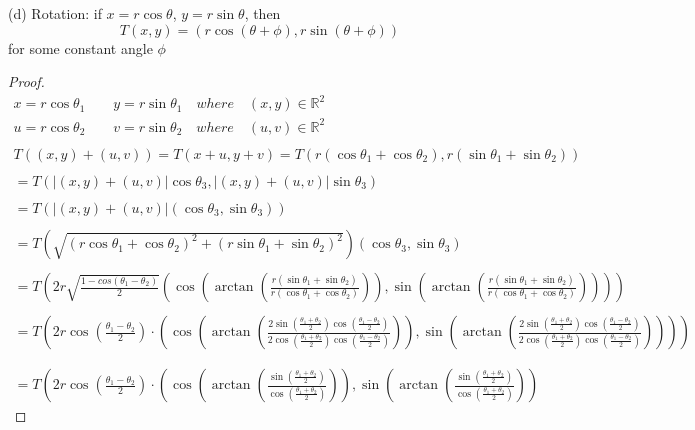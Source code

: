 \documentclass[10pt]{extarticle}
\newcommand{\reall}{\mathbb{R}}
\begin{document}
\begin{itemize}
		(d) Rotation: if $x=r\cos\theta $,  $y=r\sin\theta$, then
		\[T(x,y)=(r\cos(\theta+\phi),r\sin(\theta+\phi))\]	
		for some constant angle $\phi$
			\begin{proof}
				\begin{gather*}
					x=r\cos\theta_1 \qquad y=r\sin\theta_1  \quad where \quad (x,y)\in \reall^2
					\\
					u=r\cos\theta_2 \qquad v=r\sin\theta_2 \quad where \quad (u,v)\in \reall^2
					\\
					\\
					T((x,y)+(u,v))=T(x+u,y+v)=T(r(\cos\theta_1+\cos\theta_2),r(\sin\theta_1+\sin\theta_2))
					\\
					\\
					=T(|(x,y)+(u,v)|\cos\theta_3,|(x,y)+(u,v)|\sin\theta_3)
					\\
					\\
					=T\left(|(x,y)+(u,v)|(\cos\theta_3,\sin\theta_3)\right)	
					\\
					\\	=T\left(\sqrt{(r\cos\theta_1+\cos\theta_2)^2+(r\sin\theta_1+\sin\theta_2)^2}\right)(\cos\theta_3,\sin\theta_3)
					\\
					\\
					=T\left(2r\sqrt{\frac{1-cos(\theta_1-\theta_2)}{2}}\left(\cos\left(\arctan\left(\frac{r(\sin\theta_1+\sin\theta_2)}{r(\cos\theta_1+\cos\theta_2)}\right)\right),\sin\left(\arctan\left(\frac{r(\sin\theta_1+\sin\theta_2)}{r(\cos\theta_1+\cos\theta_2)}\right)\right)\right)\right)
					\\
					\\
					=T\left(2r\cos\left(\frac{\theta_1-\theta_2}{2}\right)\cdot\left(\cos\left(\arctan\left(\frac{2\sin\left(\frac{\theta_1+\theta_2}{2}\right)\cos\left(\frac{\theta_1-\theta_2}{2}\right)}{2\cos\left(\frac{\theta_1+\theta_2}{2}\right)\cos\left(\frac{\theta_1-\theta_2}{2}\right)}\right)\right),
					\sin\left(\arctan\left(\frac{2\sin\left(\frac{\theta_1+\theta_2}{2}\right)\cos\left(\frac{\theta_1-\theta_2}{2}\right)}{2\cos\left(\frac{\theta_1+\theta_2}{2}\right)\cos\left(\frac{\theta_1-\theta_2}{2}\right)}\right)\right)
					\right)
					\right)
					\\
					\\
					\\
					=T\left(2r\cos\left(\frac{\theta_1-\theta_2}{2}\right)\cdot\left(\cos\left(\arctan\left(\frac{\sin\left(\frac{\theta_1+\theta_2}{2}\right)}{\cos\left(\frac{\theta_1+\theta_2}{2}\right)}\right)\right),
					\sin\left(\arctan\left(\frac{\sin\left(\frac{\theta_1+\theta_2}{2}\right)}{\cos\left(\frac{\theta_1+\theta_2}{2}\right)}\right)\right)

\end{gather*}
\end{proof}
\end{itemize}
\end{document}
